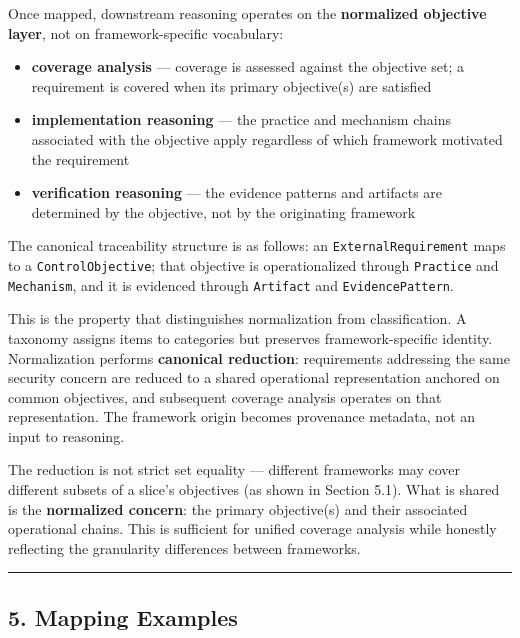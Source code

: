\documentclass[
]{article}
\providecommand{\tightlist}{%
  \setlength{\itemsep}{0pt}\setlength{\parskip}{0pt}}
\begin{document}
Once mapped, downstream reasoning operates on the \textbf{normalized
objective layer}, not on framework-specific vocabulary:

\begin{itemize}
\tightlist
\item
  \textbf{coverage analysis} --- coverage is assessed against the
  objective set; a requirement is covered when its primary objective(s)
  are satisfied
\item
  \textbf{implementation reasoning} --- the practice and mechanism
  chains associated with the objective apply regardless of which
  framework motivated the requirement
\item
  \textbf{verification reasoning} --- the evidence patterns and
  artifacts are determined by the objective, not by the originating
  framework
\end{itemize}

The canonical traceability structure is as follows: an
\texttt{ExternalRequirement} maps to a \texttt{ControlObjective}; that
objective is operationalized through \texttt{Practice} and
\texttt{Mechanism}, and it is evidenced through \texttt{Artifact} and
\texttt{EvidencePattern}.

This is the property that distinguishes normalization from
classification. A taxonomy assigns items to categories but preserves
framework-specific identity. Normalization performs \textbf{canonical
reduction}: requirements addressing the same security concern are
reduced to a shared operational representation anchored on common
objectives, and subsequent coverage analysis operates on that
representation. The framework origin becomes provenance metadata, not an
input to reasoning.

The reduction is not strict set equality --- different frameworks may
cover different subsets of a slice's objectives (as shown in Section
5.1). What is shared is the \textbf{normalized concern}: the primary
objective(s) and their associated operational chains. This is sufficient
for unified coverage analysis while honestly reflecting the granularity
differences between frameworks.

\begin{center}\rule{0.5\linewidth}{0.5pt}\end{center}

\subsection{5. Mapping Examples}\label{mapping-examples}
\end{document}
